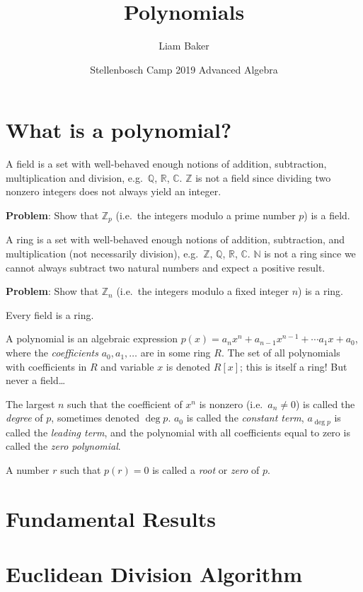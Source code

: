 \documentclass{article}
\title{Polynomials}
\author{Liam Baker}
\date{Stellenbosch Camp 2019 Advanced Algebra}
\newcommand*{\NN}{\mathbb{N}}
\newcommand*{\ZZ}{\mathbb{Z}}
\newcommand*{\QQ}{\mathbb{Q}}
\newcommand*{\RR}{\mathbb{R}}
\newcommand*{\CC}{\mathbb{C}}
\newcommand*{\eg}{e.g.\ }
\newcommand*{\ie}{i.e.\ }
\begin{document}
 \maketitle

\section{What is a polynomial?}

A field is a set with well-behaved enough notions of addition, subtraction, multiplication and division, \eg $\QQ$, $\RR$, $\CC$. $\ZZ$ is not a field since dividing two nonzero integers does not always yield an integer.

\textbf{Problem}: Show that $\ZZ_p$ (\ie the integers modulo a prime number $p$) is a field.

A ring is a set with well-behaved enough notions of addition, subtraction, and multiplication (not necessarily division), \eg $\ZZ$, $\QQ$, $\RR$, $\CC$. $\NN$ is not a ring since we cannot always subtract two natural numbers and expect a positive result.

\textbf{Problem}: Show that $\ZZ_n$ (\ie the integers modulo a fixed integer $n$) is a ring.

Every field is a ring.

A polynomial is an algebraic expression $p(x) = a_n x^n +a_{n-1} x^{n-1} +\dotsb a_1 x +a_0$, where the \emph{coefficients} $a_0, a_1, \dotsc$ are in some ring $R$. The set of all polynomials with coefficients in $R$ and variable $x$ is denoted $R[x]$; this is itself a ring! But never a field\dots

The largest $n$ such that the coefficient of $x^n$ is nonzero (\ie $a_n \neq 0$) is called the \emph{degree} of $p$, sometimes denoted $\deg{p}$. $a_0$ is called the \emph{constant term}, $a_{\deg{p}}$ is called the \emph{leading term}, and the polynomial with all coefficients equal to zero is called the \emph{zero polynomial}.

A number $r$ such that $p(r) = 0$ is called a \emph{root} or \emph{zero} of $p$.


\section{Fundamental Results}




\section{Euclidean Division Algorithm}
\end{document}
